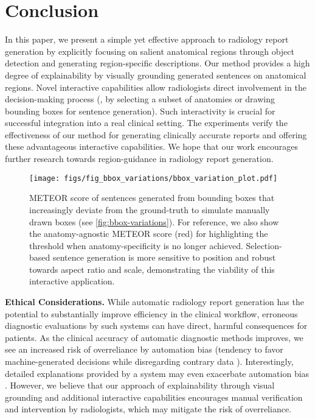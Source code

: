 \documentclass[10pt,twocolumn,letterpaper]{article}
\begin{document}
\section{Conclusion}

In this paper, we present a simple yet effective approach to radiology report generation by explicitly focusing on salient anatomical regions through object detection and generating region-specific descriptions. Our method provides a high degree of explainability by visually grounding generated sentences on anatomical regions. Novel interactive capabilities allow radiologists direct involvement in the decision-making process (\eg, by selecting a subset of anatomies or drawing bounding boxes for sentence generation). Such interactivity is crucial for successful integration into a real clinical setting. The experiments verify the effectiveness of our method for generating clinically accurate reports and offering these advantageous interactive capabilities. We hope that our work encourages further research towards region-guidance in radiology report generation.

\begin{figure}[t!]
  \centering
   \texttt{[image: figs/fig\_bbox\_variations/bbox\_variation\_plot.pdf]}
   \caption{METEOR score of sentences generated from bounding boxes that increasingly deviate from the ground-truth to simulate manually drawn boxes (see \cref{fig:bbox-variations}). For reference, we also show the anatomy-agnostic METEOR score (red) for highlighting the threshold when anatomy-specificity is no longer achieved. Selection-based sentence generation is more sensitive to position and robust towards aspect ratio and scale, demonstrating the viability of this interactive application.}
   \label{fig:bbox-variations-plot}
\end{figure}

\noindent\textbf{Ethical Considerations.} While automatic radiology report generation has the potential to substantially improve efficiency in the clinical workflow, erroneous diagnostic evaluations by such systems can have direct, harmful consequences for patients. As the clinical accuracy of automatic diagnostic methods improves, we see an increased risk of overreliance \cite{passi2022overreliance} by automation bias (tendency to favor machine-generated decisions while disregarding contrary data \cite{geis2019ethics}). Interestingly, detailed explanations provided by a system may even exacerbate automation bias \cite{schaffer2019can}. However, we believe that our approach of explainability through visual grounding and additional interactive capabilities encourages manual verification and intervention by radiologists, which may mitigate the risk of overreliance.
\end{document}
